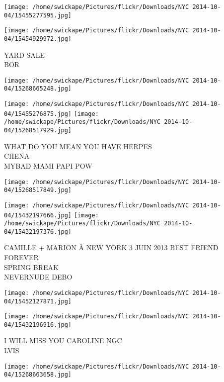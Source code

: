 \documentclass[10pt,letterpaper]{article}
\begin{document}
\texttt{[image: /home/swickape/Pictures/flickr/Downloads/NYC 2014-10-04/15455277595.jpg]}

\vspace{0.25in}
\texttt{[image: /home/swickape/Pictures/flickr/Downloads/NYC 2014-10-04/15454929972.jpg]}

YARD SALE\\
BOR\\
\pagebreak

\texttt{[image: /home/swickape/Pictures/flickr/Downloads/NYC 2014-10-04/15268665248.jpg]}

\vspace{0.25in}
\texttt{[image: /home/swickape/Pictures/flickr/Downloads/NYC 2014-10-04/15455276875.jpg]}
\texttt{[image: /home/swickape/Pictures/flickr/Downloads/NYC 2014-10-04/15268517929.jpg]}

WHAT DO YOU MEAN YOU HAVE HERPES\\
CHENA\\
MYBAD MAMI PAPI POW\\
\pagebreak

\texttt{[image: /home/swickape/Pictures/flickr/Downloads/NYC 2014-10-04/15268517849.jpg]}

\vspace{0.25in}
\texttt{[image: /home/swickape/Pictures/flickr/Downloads/NYC 2014-10-04/15432197666.jpg]}
\texttt{[image: /home/swickape/Pictures/flickr/Downloads/NYC 2014-10-04/15432197376.jpg]}

CAMILLE + MARION À NEW YORK 3 JUIN 2013 BEST FRIEND FOREVER\\
SPRING BREAK\\
NEVERNUDE DEBO\\
\pagebreak

\texttt{[image: /home/swickape/Pictures/flickr/Downloads/NYC 2014-10-04/15452127871.jpg]}

\vspace{0.25in}
\texttt{[image: /home/swickape/Pictures/flickr/Downloads/NYC 2014-10-04/15432196916.jpg]}

I WILL MISS YOU CAROLINE NGC\\
LVIS\\
\pagebreak

\texttt{[image: /home/swickape/Pictures/flickr/Downloads/NYC 2014-10-04/15268663658.jpg]}
\end{document}
